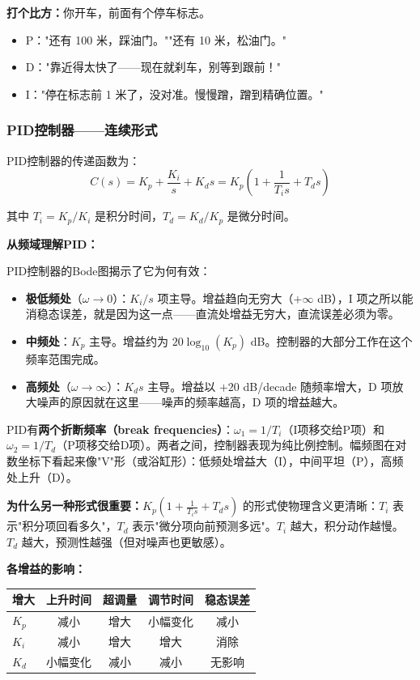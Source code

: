 \textbf{打个比方：}你开车，前面有个停车标志。
\begin{itemize}
    \item P："还有 100 米，踩油门。""还有 10 米，松油门。"
    \item D："靠近得太快了——现在就刹车，别等到跟前！"
    \item I："停在标志前 1 米了，没对准。慢慢蹭，蹭到精确位置。"
\end{itemize}

\subsubsection{PID控制器——连续形式}

PID控制器的传递函数为：
\begin{equation}
C(s) = K_p + \frac{K_i}{s} + K_d s = K_p \left(1 + \frac{1}{T_i s} + T_d s\right)
\end{equation}

其中 $T_i = K_p / K_i$ 是积分时间，$T_d = K_d / K_p$ 是微分时间。

\textbf{从频域理解PID：}

PID控制器的Bode图揭示了它为何有效：
\begin{itemize}
    \item \textbf{极低频处}（$\omega \to 0$）：$K_i/s$ 项主导。增益趋向无穷大（$+\infty$ dB），I 项之所以能消稳态误差，就是因为这一点——直流处增益无穷大，直流误差必须为零。
    \item \textbf{中频处}：$K_p$ 主导。增益约为 $20\log_{10}(K_p)$ dB。控制器的大部分工作在这个频率范围完成。
    \item \textbf{高频处}（$\omega \to \infty$）：$K_d s$ 主导。增益以 $+20$ dB/decade 随频率增大，D 项放大噪声的原因就在这里——噪声的频率越高，D 项的增益越大。
\end{itemize}

PID有\textbf{两个折断频率（break frequencies）}：$\omega_1 = 1/T_i$（I项移交给P项）和 $\omega_2 = 1/T_d$（P项移交给D项）。两者之间，控制器表现为纯比例控制。幅频图在对数坐标下看起来像"V"形（或浴缸形）：低频处增益大（I），中间平坦（P），高频处上升（D）。

\textbf{为什么另一种形式很重要：}$K_p(1 + \frac{1}{T_i s} + T_d s)$ 的形式使物理含义更清晰：$T_i$ 表示"积分项回看多久"，$T_d$ 表示"微分项向前预测多远"。$T_i$ 越大，积分动作越慢。$T_d$ 越大，预测性越强（但对噪声也更敏感）。

\textbf{各增益的影响：}

\begin{center}
\begin{tabular}{lcccc}
\toprule
\textbf{增大} & \textbf{上升时间} & \textbf{超调量} & \textbf{调节时间} & \textbf{稳态误差} \\
\midrule
$K_p$ & 减小 & 增大 & 小幅变化 & 减小 \\
$K_i$ & 减小 & 增大 & 增大 & 消除 \\
$K_d$ & 小幅变化 & 减小 & 减小 & 无影响 \\
\bottomrule
\end{tabular}
\end{center}

